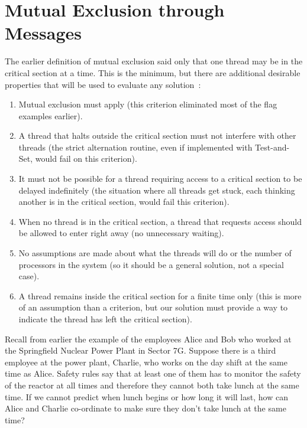 




\section*{Mutual Exclusion through Messages}

The earlier definition of mutual exclusion said only that one thread may be in the critical section at a time. This is the minimum, but there are additional desirable properties that will be used to evaluate any solution~\cite{osi}:
\begin{enumerate}
	\item Mutual exclusion must apply (this criterion eliminated most of the flag examples earlier).
	\item A thread that halts outside the critical section must not interfere with other threads (the strict alternation routine, even if implemented with Test-and-Set, would fail on this criterion).
	\item It must not be possible for a thread requiring access to a critical section to be delayed indefinitely (the situation where all threads get stuck, each thinking another is in the critical section, would fail this criterion).
	\item When no thread is in the critical section, a thread that requests access should be allowed to enter right away (no unnecessary waiting).
	\item No assumptions are made about what the threads will do or the number of processors in the system (so it should be a general solution, not a special case).
	\item A thread remains inside the critical section for a finite time only (this is more of an assumption than a criterion, but our solution must provide a way to indicate the thread has left the critical section).
\end{enumerate}

Recall from earlier the example of the employees Alice and Bob who worked at the Springfield Nuclear Power Plant in Sector 7G.  Suppose there is a third employee at the power plant, Charlie, who works on the day shift at the same time as Alice. Safety rules say that at least one of them has to monitor the safety of the reactor at all times and therefore they cannot both take lunch at the same time. If we cannot predict when lunch begins or how long it will last, how can Alice and Charlie co-ordinate to make sure they don't take lunch at the same time?

